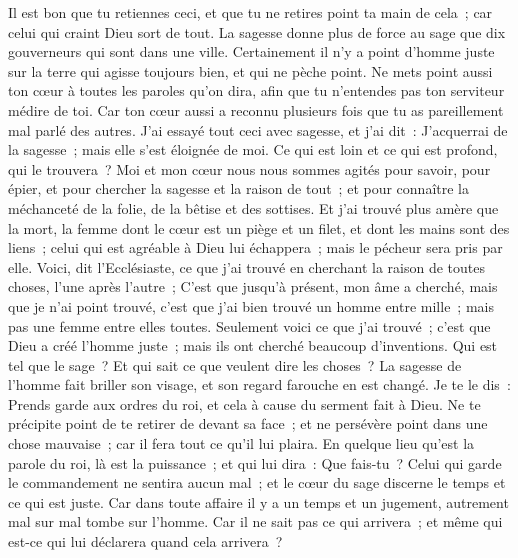\begin{multicols}{2}
Il est bon que tu retiennes ceci, et que tu ne retires point ta main de cela~; car celui qui craint Dieu sort de tout.
La sagesse donne plus de force au sage que dix gouverneurs qui sont dans une ville.
Certainement il n'y a point d'homme juste sur la terre qui agisse toujours bien, et qui ne pèche point.
Ne mets point aussi ton cœur à toutes les paroles qu'on dira, afin que tu n'entendes pas ton serviteur médire de toi. 
Car ton cœur aussi a reconnu plusieurs fois que tu as pareillement mal parlé des autres. 
J'ai essayé tout ceci avec sagesse, et j'ai dit~: J'acquerrai de la sagesse~; mais elle s'est éloignée de moi. 
Ce qui est loin et ce qui est profond, qui le trouvera~?
Moi et mon cœur nous nous sommes agités pour savoir, pour épier, et pour chercher la sagesse et la raison de tout~; et pour connaître la méchanceté de la folie, de la bêtise et des sottises. 
Et j'ai trouvé plus amère que la mort, la femme dont le cœur est un piège et un filet, et dont les mains sont des liens~; celui qui est agréable à Dieu lui échappera~; mais le pécheur sera pris par elle.
Voici, dit l'Ecclésiaste, ce que j'ai trouvé en cherchant la raison de toutes choses, l'une après l'autre~;
C'est que jusqu'à présent, mon âme a cherché, mais que je n'ai point trouvé, c'est que j'ai bien trouvé un homme entre mille~; mais pas une femme entre elles toutes. 
Seulement voici ce que j'ai trouvé~; c'est que Dieu a créé l'homme juste~; mais ils ont cherché beaucoup d'inventions.
\VerseOne{}Qui est tel que le sage~? Et qui sait ce que veulent dire les choses~? La sagesse de l'homme fait briller son visage, et son regard farouche en est changé.
Je te le dis~: Prends garde aux ordres du roi, et cela à cause du serment fait à Dieu.
Ne te précipite point de te retirer de devant sa face~; et ne persévère point dans une chose mauvaise~; car il fera tout ce qu'il lui plaira. 
En quelque lieu qu'est la parole du roi, là est la puissance~; et qui lui dira~: Que fais-tu~? 
Celui qui garde le commandement ne sentira aucun mal~; et le cœur du sage discerne le temps et ce qui est juste. 
Car dans toute affaire il y a un temps et un jugement, autrement mal sur mal tombe sur l'homme. 
Car il ne sait pas ce qui arrivera~; et même qui est-ce qui lui déclarera quand cela arrivera~? 

\end{multicols}
